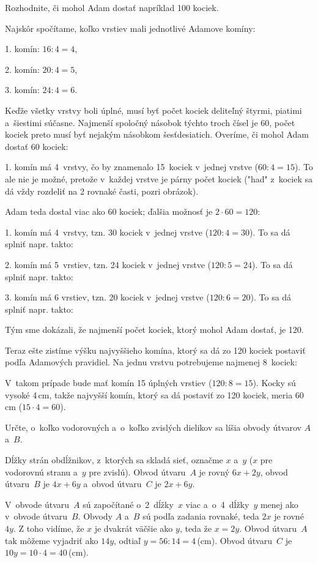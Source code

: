 {%
\napad
Rozhodnite, či mohol Adam dostať napríklad 100 kociek.

\riesenie
Najskôr spočítame, koľko vrstiev mali jednotlivé Adamove komíny:
\par 1. komín: $16:4=4$,
\par 2. komín: $20:4=5$,
\par 3. komín: $24:4=6$.

Keďže všetky vrstvy boli úplné, musí byť počet kociek deliteľný štyrmi,
piatimi a~šiestimi súčasne.
Najmenší spoločný násobok týchto troch čísel je 60, počet kociek preto musí
byť nejakým násobkom šesťdesiatich.
Overíme, či mohol Adam dostať 60 kociek:

1. komín má 4~vrstvy, čo by znamenalo 15~kociek v~jednej vrstve ($60:4=15$).
To ale nie je možné, pretože v~každej vrstve je párny počet kociek
("had" z~kociek sa dá vždy rozdeliť na 2 rovnaké časti, pozri obrázok).
%

Adam teda dostal viac ako 60 kociek; ďalšia možnosť je $2\cdot60=120$:

1. komín má 4~vrstvy, tzn. 30 kociek v~jednej vrstve ($120:4=30$).
To sa dá splniť napr. takto:
%

2. komín má 5~vrstiev, tzn. 24 kociek v~jednej vrstve ($120:5=24$).
To sa dá splniť napr. takto:
%

3. komín má 6 vrstiev, tzn. 20 kociek v~jednej vrstve ($120:6=20$).
To sa dá splniť napr. takto:
%

Tým sme dokázali, že najmenší počet kociek, ktorý mohol Adam dostať, je 120.

Teraz ešte zistíme výšku najvyššieho komína, ktorý sa dá zo 120 kociek
postaviť podľa Adamových pravidiel. Na jednu vrstvu potrebujeme najmenej
8~kociek:
%

V~takom prípade bude mať komín 15 úplných vrstiev ($120:8=15$).
Kocky sú vysoké 4\,cm, takže najvyšší komín, ktorý sa dá postaviť zo 120
kociek, meria 60\,cm ($15\cdot4=60$).
}

{%
\napad
Určte, o~koľko vodorovných a~o~koľko zvislých dielikov sa líšia obvody útvarov
$A$ a~$B$.

\riesenie
Dĺžky strán obdĺžnikov, z~ktorých sa skladá sieť, označme $x$ a~$y$ ($x$ pre
vodorovnú stranu a~$y$ pre zvislú). Obvod útvaru~$A$ je rovný $6x+2y$,
obvod útvaru~$B$ je $4x+6y$ a~obvod útvaru~$C$ je $2x+6y$.

V~obvode útvaru~$A$ sú započítané o~2~dĺžky~$x$ viac
a~o~4~dĺžky~$y$ menej ako v~obvode útvaru~$B$. Obvody $A$ a~$B$ sú podľa zadania rovnaké, teda $2x$ je rovné $4y$. Z toho vidíme, že $x$ je dvakrát
väčšie ako $y$, teda že $x=2y$. Obvod útvaru~$A$ tak môžeme vyjadriť ako
$14y$, odtiaľ $y=56:14=4$\,(cm). Obvod útvaru~$C$ je $10y=10\cdot4=40$\,(cm).
}

